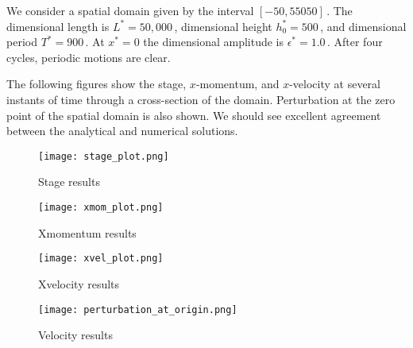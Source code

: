 We consider a spatial domain given by the interval $[-50, 55050]$\,. The dimensional length is $L^*=50,000$\,, dimensional height $h_0^*=500$\,, and dimensional period $T^*=900$\,. At $x^*=0$ the dimensional amplitude is $\epsilon^*=1.0$\,. After four cycles, periodic motions are clear.

The following figures show the stage, $x$-momentum, and $x$-velocity at several instants of time through a cross-section of the domain. Perturbation at the zero point of the spatial domain is also shown.
We should see excellent agreement between the analytical and numerical solutions.

\begin{figure}
\begin{center}
\texttt{[image: stage\_plot.png]}
\end{center}
\caption{Stage results}
\end{figure}

\begin{figure}
\begin{center}
\texttt{[image: xmom\_plot.png]}
\end{center}
\caption{Xmomentum results}
\end{figure}

\begin{figure}
\begin{center}
\texttt{[image: xvel\_plot.png]}
\end{center}
\caption{Xvelocity results}
\end{figure}


\begin{figure}
\begin{center}
\texttt{[image: perturbation\_at\_origin.png]}
\end{center}
\caption{Velocity results}
\end{figure}


\endinput
